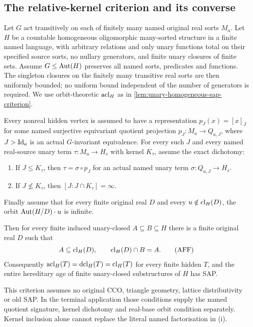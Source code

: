 \subsection{The relative-kernel criterion and its converse}

\begin{theorem}
\label{thm:typed-abstract-fresh-frame-sap}
Let $G$ act transitively on each of finitely many named original real
sorts $M_a$. Let $H$ be a countable homogeneous oligomorphic many-sorted
structure in a finite named language, with arbitrary relations and only
unary functions total on their specified source sorts, no nullary
generators, and finite unary closures of finite sets. Assume
$G\le\operatorname{Aut}(H)$ preserves all named sorts, predicates and functions.
The singleton closures on the finitely many transitive real sorts are
then uniformly bounded; no uniform bound independent of the number
of generators is required. We use orbit-theoretic $\operatorname{acl}_H$ as in
\cref{lem:unary-homogeneous-sap-criterion}.

Every nonreal hidden vertex is assumed to have a representation
$p_J(x)=[x]_J$ for some named surjective equivariant quotient projection
$p_J:M_a\to Q_{a,J}$, where $J>\mathrm{Id}_a$ is an actual $G$-invariant
equivalence. For every such $J$ and every named real-source unary
term $\tau:M_a\to H_s$ with kernel $K_\tau$, assume the exact dichotomy:
\begin{enumerate}[label=(\roman*)]
\item If $J\le K_\tau$, then $\tau=\sigma\circ p_J$ for an actual
  named unary term $\sigma:Q_{a,J}\to H_s$.
\item If $J\nleq K_\tau$, then $[J:J\cap K_\tau]=\infty$.
\end{enumerate}
Finally assume that for every finite original real $D$ and every
$u\notin\operatorname{cl}_H(D)$, the orbit $\operatorname{Aut}(H/D)\cdot u$ is infinite.

Then for every finite induced unary-closed $A\subseteq B\subseteq H$
there is a finite original real $D$ such that
\[
       A\subseteq\operatorname{cl}_H(D),\qquad \operatorname{cl}_H(D)\cap B=A.
\tag{AFF}\label{eq:typed-abstract-fresh-frame}
\]
Consequently $\operatorname{acl}_H(T)=\operatorname{dcl}_H(T)=\operatorname{cl}_H(T)$ for every
finite hidden $T$, and the entire hereditary age of finite unary-closed
substructures of $H$ has SAP.

This criterion assumes no original CCO, triangle geometry, lattice
distributivity or old SAP. In the terminal application those conditions
supply the named quotient signature, kernel dichotomy and real-base
orbit condition separately. Kernel inclusion alone cannot replace the
literal named factorisation in (i).
\end{theorem}
